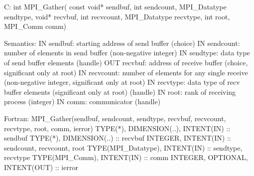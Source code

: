 C:
int MPI_Gather(
  const void* sendbuf, int sendcount, MPI_Datatype sendtype,
  void* recvbuf, int recvcount, MPI_Datatype recvtype,
  int root, MPI_Comm comm)

Semantics:
IN sendbuf: starting address of send buffer (choice)
IN sendcount: number of elements in send buffer (non-negative integer)
IN sendtype: data type of send buffer elements (handle)
OUT recvbuf: address of receive buffer (choice, significant only at root)
IN recvcount: number of elements for any single receive (non-negative integer, significant only at root)
IN recvtype: data type of recv buffer elements (significant only at root) (handle)
IN root: rank of receiving process (integer)
IN comm: communicator (handle)

Fortran:
MPI_Gather(sendbuf, sendcount, sendtype, recvbuf, recvcount, recvtype, root, comm, ierror)
TYPE(*), DIMENSION(..), INTENT(IN) :: sendbuf
TYPE(*), DIMENSION(..) :: recvbuf
INTEGER, INTENT(IN) :: sendcount, recvcount, root
TYPE(MPI_Datatype), INTENT(IN) :: sendtype, recvtype
TYPE(MPI_Comm), INTENT(IN) :: comm
INTEGER, OPTIONAL, INTENT(OUT) :: ierror
